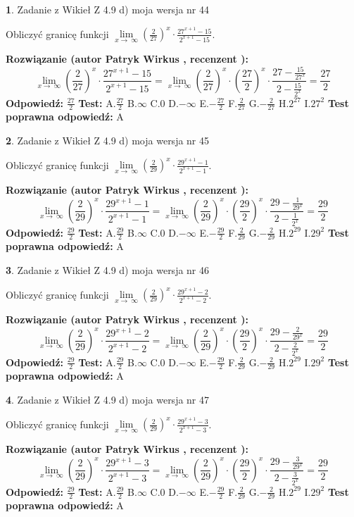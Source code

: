 \documentclass[12pt, a4paper]{article}
\theoremstyle{definition} %
\newtheorem{zad}{}
\newcommand{\zadStart}[1]{\begin{zad}#1\newline}
\newcommand{\zadStop}{\end{zad}}
\newcommand{\rozwStart}[2]{\noindent \textbf{Rozwiązanie (autor #1 , recenzent #2): }\newline}
\newcommand{\rozwStop}{\newline}
\newcommand{\odpStart}{\noindent \textbf{Odpowiedź:}\newline}
\newcommand{\odpStop}{\newline}
\newcommand{\testStart}{\noindent \textbf{Test:}\newline}
\newcommand{\testStop}{\newline}
\newcommand{\kluczStart}{\noindent \textbf{Test poprawna odpowiedź:}\newline}
\newcommand{\kluczStop}{\newline}
\begin{document}
\zadStart{Zadanie z Wikieł Z 4.9 d) moja wersja nr 44}


Obliczyć granicę funkcji  $\lim\limits_{x\to\ \infty}(\frac{2}{27})^{x}\cdot\frac{27^{x+1}-15}{2^{x+1}-15}$.
\zadStop
\rozwStart{Patryk Wirkus}{}
$$\lim\limits_{x\to\ \infty}(\frac{2}{27})^{x}\cdot\frac{27^{x+1}-15}{2^{x+1}-15}=\lim\limits_{x\to\ \infty}(\frac{2}{27})^{x}\cdot(\frac{27}{2})^{x} \cdot \frac{27-\frac{15}{27^{x}}}{2-\frac{15}{2^{x}}} = \frac{27}{2}$$
\rozwStop
\odpStart
$\frac{27}{2}$
\odpStop
\testStart
A.$\frac{27}{2}$ B.$\infty$ C.$0$ D.$-\infty$ E.$-\frac{27}{2}$
F.$\frac{2}{27}$ G.$-\frac{2}{27}$
H.$2^{27}$
I.$27^{2}$
\testStop
\kluczStart
A
\kluczStop



\zadStart{Zadanie z Wikieł Z 4.9 d) moja wersja nr 45}


Obliczyć granicę funkcji  $\lim\limits_{x\to\ \infty}(\frac{2}{29})^{x}\cdot\frac{29^{x+1}-1}{2^{x+1}-1}$.
\zadStop
\rozwStart{Patryk Wirkus}{}
$$\lim\limits_{x\to\ \infty}(\frac{2}{29})^{x}\cdot\frac{29^{x+1}-1}{2^{x+1}-1}=\lim\limits_{x\to\ \infty}(\frac{2}{29})^{x}\cdot(\frac{29}{2})^{x} \cdot \frac{29-\frac{1}{29^{x}}}{2-\frac{1}{2^{x}}} = \frac{29}{2}$$
\rozwStop
\odpStart
$\frac{29}{2}$
\odpStop
\testStart
A.$\frac{29}{2}$ B.$\infty$ C.$0$ D.$-\infty$ E.$-\frac{29}{2}$
F.$\frac{2}{29}$ G.$-\frac{2}{29}$
H.$2^{29}$
I.$29^{2}$
\testStop
\kluczStart
A
\kluczStop



\zadStart{Zadanie z Wikieł Z 4.9 d) moja wersja nr 46}


Obliczyć granicę funkcji  $\lim\limits_{x\to\ \infty}(\frac{2}{29})^{x}\cdot\frac{29^{x+1}-2}{2^{x+1}-2}$.
\zadStop
\rozwStart{Patryk Wirkus}{}
$$\lim\limits_{x\to\ \infty}(\frac{2}{29})^{x}\cdot\frac{29^{x+1}-2}{2^{x+1}-2}=\lim\limits_{x\to\ \infty}(\frac{2}{29})^{x}\cdot(\frac{29}{2})^{x} \cdot \frac{29-\frac{2}{29^{x}}}{2-\frac{2}{2^{x}}} = \frac{29}{2}$$
\rozwStop
\odpStart
$\frac{29}{2}$
\odpStop
\testStart
A.$\frac{29}{2}$ B.$\infty$ C.$0$ D.$-\infty$ E.$-\frac{29}{2}$
F.$\frac{2}{29}$ G.$-\frac{2}{29}$
H.$2^{29}$
I.$29^{2}$
\testStop
\kluczStart
A
\kluczStop



\zadStart{Zadanie z Wikieł Z 4.9 d) moja wersja nr 47}


Obliczyć granicę funkcji  $\lim\limits_{x\to\ \infty}(\frac{2}{29})^{x}\cdot\frac{29^{x+1}-3}{2^{x+1}-3}$.
\zadStop
\rozwStart{Patryk Wirkus}{}
$$\lim\limits_{x\to\ \infty}(\frac{2}{29})^{x}\cdot\frac{29^{x+1}-3}{2^{x+1}-3}=\lim\limits_{x\to\ \infty}(\frac{2}{29})^{x}\cdot(\frac{29}{2})^{x} \cdot \frac{29-\frac{3}{29^{x}}}{2-\frac{3}{2^{x}}} = \frac{29}{2}$$
\rozwStop
\odpStart
$\frac{29}{2}$
\odpStop
\testStart
A.$\frac{29}{2}$ B.$\infty$ C.$0$ D.$-\infty$ E.$-\frac{29}{2}$
F.$\frac{2}{29}$ G.$-\frac{2}{29}$
H.$2^{29}$
I.$29^{2}$
\testStop
\kluczStart
A
\kluczStop
\end{document}
